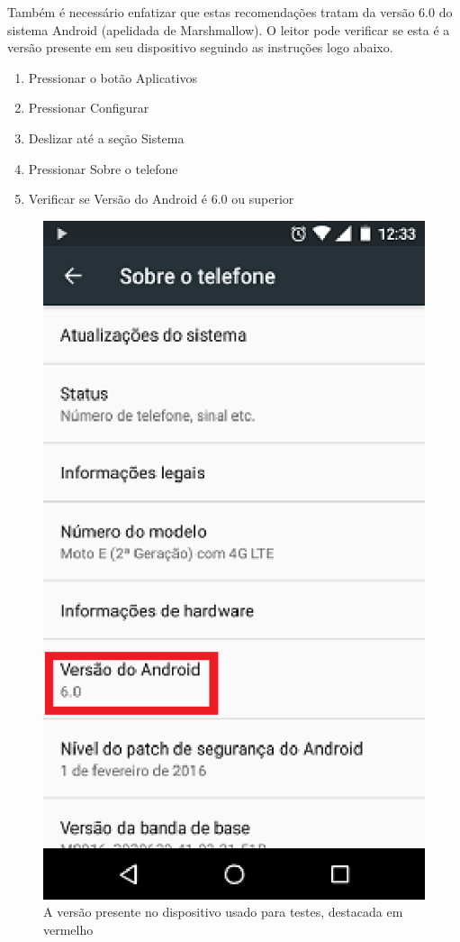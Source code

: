Tamb\'em \'e necess\'ario enfatizar que estas recomenda\c c\~oes tratam da vers\~ao 6.0 do sistema Android (apelidada de Marshmallow). O leitor pode verificar se esta \'e a vers\~ao presente em seu dispositivo seguindo as instru\c c\~oes logo abaixo.

\begin{enumerate}
\item Pressionar o bot\~ao Aplicativos
\item Pressionar Configurar
\item Deslizar at\'e a se\c c\~ao Sistema
\item Pressionar Sobre o telefone
\item Verificar se Vers\~ao do Android \'e 6.0 ou superior
\end{enumerate}

\begin{figure}[h]
	\centering
	\includegraphics{imagem2.eps}
	\caption{A vers\~ao presente no dispositivo usado para testes, destacada em vermelho}
\end{figure}

